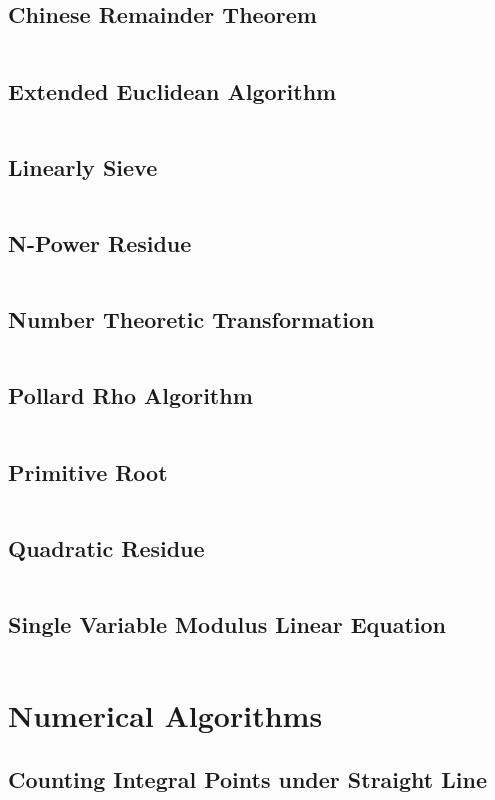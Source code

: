 \documentclass[a4paper,openany]{book}
\newcommand{\cppcode}[1]
{
  \inputminted[mathescape,
  tabsize=4,
  linenos,
  framesep=2mm,
  breakaftergroup=true,
  breakautoindent=true,
  breakbytoken=true,
  breaklines=true,
  fontsize=\small
  ]{cpp}{source/#1}
}
\begin{document}
\section{Chinese Remainder Theorem}
\cppcode{/Number Theory/Chinese Remainder Theorem.cpp}
\section{Extended Euclidean Algorithm}
\cppcode{/Number Theory/Extended Euclidean Algorithm.cpp}
\section{Linearly Sieve}
\cppcode{/Number Theory/Linearly Sieve.cpp}
\section{N-Power Residue}
\cppcode{/Number Theory/N-Power Residue.cpp}
\section{Number Theoretic Transformation}
\cppcode{/Number Theory/Number Theoretic Transformation.cpp}
\section{Pollard Rho Algorithm}
\cppcode{/Number Theory/Pollard Rho Algorithm.cpp}
\section{Primitive Root}
\cppcode{/Number Theory/Primitive Root.cpp}
\section{Quadratic Residue}
\cppcode{/Number Theory/Quadratic Residue.cpp}
\section{Single Variable Modulus Linear Equation}
\cppcode{/Number Theory/Single Variable Modulus Linear Equation.cpp}

\chapter{Numerical Algorithms}
\section{Counting Integral Points under Straight Line}
\cppcode{/Numerical Algorithms/Counting Integral Points under Straight Line.cpp}
\end{document}

